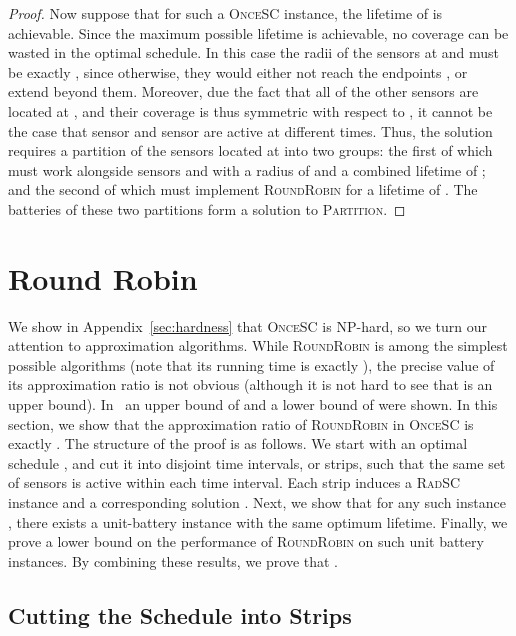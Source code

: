 \documentclass[11pt]{article}
\newcommand{\sosc}{\textsc{OnceSC}\xspace}
\newcommand{\srsc}{\textsc{RadSC}\xspace}
\newcommand{\partition}{\textsc{Partition}\xspace}
\newcommand{\rr}{\textsc{RoundRobin}\xspace}
\begin{document}
\begin{proof}
Now suppose that for such a \sosc instance, the lifetime of  is
achievable. Since the maximum possible lifetime is achievable, no
coverage can be wasted in the optimal schedule. In this case the radii
of the sensors at  and  must be exactly
, since otherwise, they would either not reach the endpoints
, or extend beyond them. Moreover, due the fact that all of
the other sensors are located at , and their coverage is thus
symmetric with respect to , it cannot be the case that sensor
 and sensor  are active at different times. Thus, the solution
requires a partition of the sensors located at  into two
groups: the first of which must work alongside sensors  and 
with a radius of  and a combined lifetime of ; and the
second of which must implement \rr for a lifetime of . The
batteries of these two partitions form a solution to \partition.
\end{proof}






\section{Round Robin}
\label{sec:rr}

We show in Appendix~\ref{sec:hardness} that \sosc is NP-hard, so 
we turn our attention to approximation algorithms.  While \rr is among
the simplest possible algorithms (note that its running time is
exactly ), the precise value of its approximation ratio is not
obvious (although it is not hard to see that  is an upper bound).
In~\cite{barnoy2011maximizing} an upper bound of  and a lower
bound of  were shown.
In this section, we show that the approximation ratio of \rr in \sosc
is exactly .
The structure of the proof is as follows.  We start with an optimal
schedule , and cut it into disjoint time intervals, or strips, such
that the same set of sensors is active within each time interval.
Each strip induces a \srsc instance  and a corresponding solution
.
Next, we show that for any such instance , there exists a
unit-battery instance  with the same optimum lifetime. Finally,
we prove a lower bound on the performance of \rr on such unit battery
instances. By combining these results, we prove that .






\subsection{Cutting the Schedule into Strips}
\end{document}
